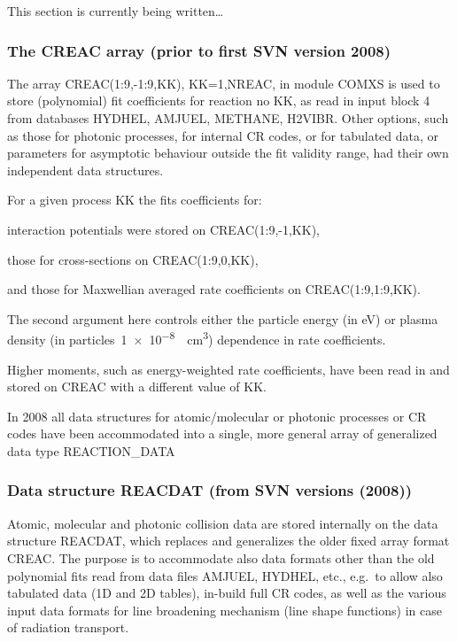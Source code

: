 This section is currently being written\dots 

\subsubsection{The CREAC array (prior to first SVN version 2008)}

The array CREAC(1:9,-1:9,KK), KK=1,NREAC, in module COMXS is used to store
(polynomial) fit coefficients for reaction no KK, as read in input block 4 from
databases HYDHEL, AMJUEL, METHANE, H2VIBR.
Other options, such as those for photonic processes, for internal CR codes, or
for tabulated data, or parameters for asymptotic behaviour outside the fit
validity range, had their own independent data structures.

For a given process KK the fits coefficients for:

interaction potentials were stored on
CREAC(1:9,-1,KK),

those for cross-sections
on CREAC(1:9,0,KK),

and those for Maxwellian averaged rate coefficients on CREAC(1:9,1:9,KK).

\medskip

The second argument here controls either the particle energy (in
\si{\electronvolt}) or plasma density (in
particles~\SI{1e-8}{\per\cubic\centi\metre}) dependence in rate coefficients.

Higher moments, such as energy-weighted rate coefficients, have been read in
and stored on CREAC with a different value of KK.

In 2008 all data structures for atomic\slash molecular or photonic processes or
CR codes have been accommodated into a single, more general array of
generalized data type REACTION\_DATA 

\subsubsection{Data structure REACDAT (from SVN versions (2008))}

Atomic, molecular and photonic collision data are stored internally on the data
structure REACDAT, which replaces and generalizes the older fixed array format
CREAC.
The purpose is to accommodate also data formats other than the old polynomial
fits read from data files AMJUEL, HYDHEL, etc., e.g.\ to allow also tabulated
data (1D and 2D tables), in-build full CR codes, as well as the various input
data formats for line broadening mechanism (line shape functions) in case of
radiation transport.

